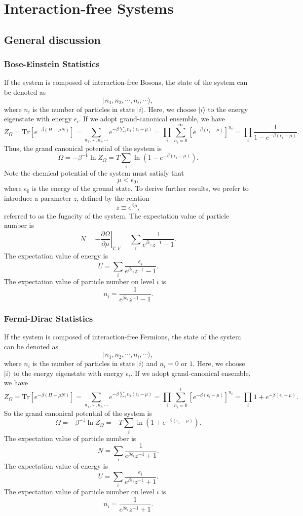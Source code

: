 \chapter{Interaction-free Systems}
\section{General discussion}
\subsection{Bose-Einstein Statistics}
If the system is composed of interaction-free Bosons, the state of the system can be denoted as
\[|n_1,n_2,\cdots,n_i,\cdots\rangle,\]
where $n_i$ is the number of particles in state $|i\rangle$. Here, we choose $|i\rangle$ to the energy eigenstate with energy $\epsilon_i$. 
If we adopt grand-canonical ensemble, we have
\[Z_{\Omega} = \mathrm{Tr}[e^{-\beta(H-\mu N)}] = \sum_{n_1,\cdots,n_i,\cdots} e^{-\beta \sum_{i}n_i(\epsilon_i-\mu)} = \prod_{i}\sum_{n_i=0}^{\infty}[e^{-\beta(\epsilon_i-\mu)}]^{n_i} = \prod_{i} \frac{1}{1-e^{-\beta(\epsilon_i - \mu)}}.\]
Thus, the grand canonical potential of the system is
\[\Omega = -\beta^{-1}\ln Z_{\Omega} = T \sum_i \ln (1 - e^{-\beta(\epsilon_i - \mu)}).\]
Note the chemical potential of the system must satisfy that
\[\mu < \epsilon_0,\] 
where $\epsilon_0$ is the energy of the ground state.
To derive further results, we prefer to introduce a parameter $z$, defined by the relation
\[z  \equiv e^{\beta \mu},\] 
referred to as the fugacity of the system.
The expectation value of particle number is
\[N = - \left. \frac{\partial \Omega}{\partial \mu} \right|_{T,V} = \sum_i \frac{1}{e^{\beta \epsilon_i}z^{-1}-1}.\]
The expectation value of energy is
\[U = \sum_i \frac{\epsilon_i}{e^{\beta \epsilon_i}z^{-1}-1}.\]
The expectation value of particle number on level $i$ is
\[n_i =  \frac{1}{e^{\beta \epsilon_i}z^{-1}-1}.\]

\subsection{Fermi-Dirac Statistics}
If the system is composed of interaction-free Fermions, the state of the system can be denoted as
\[|n_1,n_2,\cdots,n_i,\cdots\rangle,\] 
where $n_i$ is the number of particles in state $|i\rangle$ and $n_i = 0$ or $1$. Here, we choose $|i\rangle$ to the energy eigenstate with energy $\epsilon_i$.
If we adopt grand-canonical ensemble, we have
\[Z_{\Omega} = \mathrm{Tr}[e^{-\beta(H-\mu N)}] = \sum_{n_1,\cdots,n_i,\cdots} e^{-\beta \sum_{i}n_i(\epsilon_i-\mu)} = \prod_{i}\sum_{n_i=0}^{1}[e^{-\beta(\epsilon_i-\mu)}]^{n_i} = \prod_{i} 1+e^{-\beta(\epsilon_i - \mu)}.\]
So the grand canonical potential of the system is
\[\Omega = -\beta^{-1}\ln Z_{\Omega} = -T \sum_i \ln (1 + e^{-\beta(\epsilon_i - \mu)}).\]
The expectation value of particle number is
\[N = \sum_i \frac{1}{e^{\beta \epsilon_i}z^{-1}+1}.\]
The expectation value of energy is
\[U = \sum_i \frac{\epsilon_i}{e^{\beta \epsilon_i}z^{-1}+1}.\]
The expectation value of particle number on level $i$ is
\[n_i =  \frac{1}{e^{\beta \epsilon_i}z^{-1}+1}.\]

